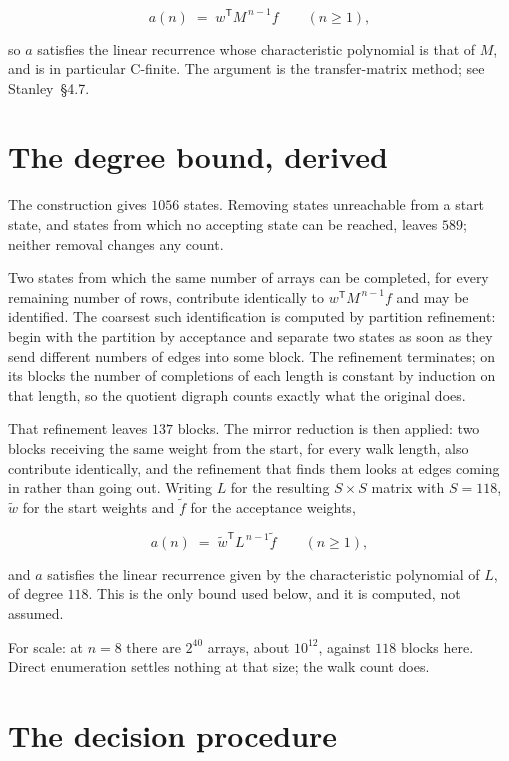 \documentclass[11pt]{article}
\theoremstyle{definition}
\begin{document}
\[a(n) \;=\; w^{\mathsf T} M^{\,n-1} f \qquad (n \ge 1),\]

so $a$ satisfies the linear recurrence whose characteristic polynomial is that of $M$, and is in particular C-finite. The argument is the transfer-matrix method; see Stanley~\S4.7.

\section{The degree bound, derived}

The construction gives $1056$ states. Removing states unreachable from a start state, and states from which no accepting state can be reached, leaves $589$; neither removal changes any count.

Two states from which the same number of arrays can be completed, for every remaining number of rows, contribute identically to $w^{\mathsf T}M^{\,n-1}f$ and may be identified. The coarsest such identification is computed by partition refinement: begin with the partition by acceptance and separate two states as soon as they send different numbers of edges into some block. The refinement terminates; on its blocks the number of completions of each length is constant by induction on that length, so the quotient digraph counts exactly what the original does.

That refinement leaves $137$ blocks. The mirror reduction is then applied: two blocks receiving the same weight from the start, for every walk length, also contribute identically, and the refinement that finds them looks at edges coming in rather than going out. Writing $L$ for the resulting $S \times S$ matrix with $S = 118$, $\tilde w$ for the start weights and $\tilde f$ for the acceptance weights,

\[a(n) \;=\; \tilde w^{\mathsf T} L^{\,n-1} \tilde f \qquad (n \ge 1),\]

and $a$ satisfies the linear recurrence given by the characteristic polynomial of $L$, of degree $118$. This is the only bound used below, and it is computed, not assumed.

For scale: at $n = 8$ there are $2^{40}$ arrays, about $10^{12}$, against $118$ blocks here. Direct enumeration settles nothing at that size; the walk count does.

\section{The decision procedure}
\end{document}
